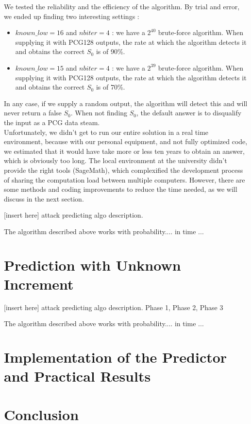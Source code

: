 \documentclass[preprint]{iacrtrans}
\begin{document}
We tested the reliability and the efficiency of the algorithm. By trial and error, we ended up finding two interesting settings :
\begin{itemize}
    \item $known\_low = 16$ and $nbiter = 4$ : we have a $2^{40}$ brute-force algorithm. When supplying it with PCG128 outputs, the rate at which the algorithm detects it and obtains the correct $S_0$ is of 90\%.
    \item $known\_low = 15$ and $nbiter = 4$ : we have a $2^{39}$ brute-force algorithm. When supplying it with PCG128 outputs, the rate at which the algorithm detects it and obtains the correct $S_0$ is of 70\%.
\end{itemize}

In any case, if we supply a random output, the algorithm will detect this and will never return a false $S_0$. When not finding $S_0$, the default answer is to disqualify the input as a PCG data steam.\\

Unfortunately, we didn't get to run our entire solution in a real time environment, because with our personal equipment, and not fully optimized code, we estimated that it would have take more or less ten years to obtain an answer, which is obviously too long.
The local environment at the university didn't provide the right tools (SageMath), which complexified the development process of sharing the computation load between multiple computers. However, there are some methods and coding improvements to reduce the time needed, as we will discuss in the next section.

[insert here] attack predicting algo description.

\begin{theorem}
  The algorithm described above works with probability.... in time ...
\end{theorem}

\section{Prediction with Unknown Increment}

[insert here] attack predicting algo description. Phase 1, Phase 2, Phase 3

\begin{theorem}
  The algorithm described above works with probability.... in time ...
\end{theorem}

\section{Implementation of the Predictor and Practical Results}

\section{Conclusion}




\end{document}

